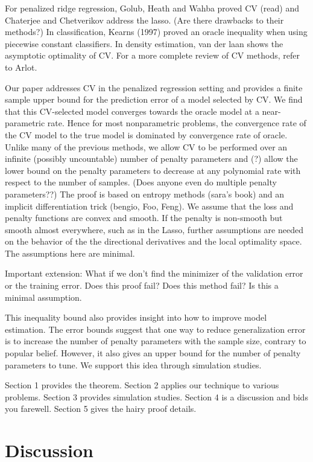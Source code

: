 \documentclass[12pt]{article}
\begin{document}
For penalized ridge regression, Golub, Heath and Wahba proved CV (read) and Chaterjee and Chetverikov address the lasso. (Are there drawbacks to their methods?) In classification, Kearns (1997) proved an oracle inequality when using piecewise constant classifiers. In density estimation, van der laan shows the asymptotic optimality of CV. For a more complete review of CV methods, refer to Arlot.

Our paper addresses CV in the penalized regression setting and provides a finite sample upper bound for the prediction error of a model selected by CV. We find that this CV-selected model converges towards the oracle model at a near-parametric rate. Hence for most nonparametric problems, the convergence rate of the CV model to the true model is dominated by convergence rate of oracle. Unlike many of the previous methods, we allow CV to be performed over an infinite (possibly uncountable) number of penalty parameters and (?) allow the lower bound on the penalty parameters to decrease at any polynomial rate with respect to the number of samples. (Does anyone even do multiple penalty parameters??) The proof is based on entropy methods (sara's book) and an implicit differentiation trick (bengio, Foo, Feng). We assume that the loss and penalty functions are convex and smooth. If the penalty is non-smooth but smooth almost everywhere, such as in the Lasso, further assumptions are needed on the behavior of the the directional derivatives and the local optimality space. The assumptions here are minimal.

Important extension: What if we don't find the minimizer of the validation error or the training error. Does this proof fail? Does this method fail? Is this a minimal assumption.

This inequality bound also provides insight into how to improve model estimation. The error bounds suggest that one way to reduce generalization error is to increase the number of penalty parameters with the sample size, contrary to popular belief. However, it also gives an upper bound for the number of penalty parameters to tune. We support this idea through simulation studies.

Section 1 provides the theorem. Section 2 applies our technique to various problems. Section 3 provides simulation studies. Section 4 is a discussion and bids you farewell. Section 5 gives the hairy proof details.


\section{Discussion}


\bigskip
\end{document}
